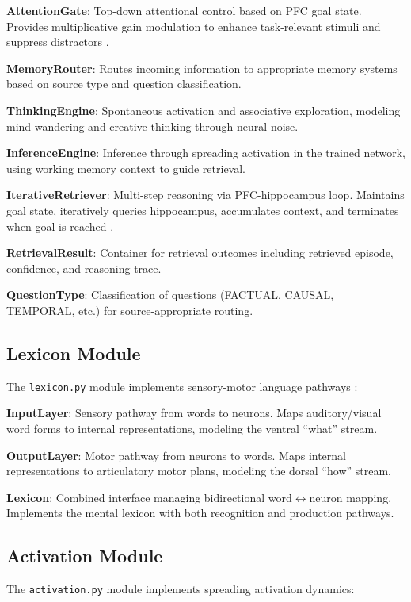 \documentclass[11pt]{article}
\begin{document}
\textbf{AttentionGate}: Top-down attentional control based on PFC goal state. Provides multiplicative gain modulation to enhance task-relevant stimuli and suppress distractors \citep{desimone1995neural}.

\textbf{MemoryRouter}: Routes incoming information to appropriate memory systems based on source type and question classification.

\textbf{ThinkingEngine}: Spontaneous activation and associative exploration, modeling mind-wandering and creative thinking through neural noise.

\textbf{InferenceEngine}: Inference through spreading activation in the trained network, using working memory context to guide retrieval.

\textbf{IterativeRetriever}: Multi-step reasoning via PFC-hippocampus loop. Maintains goal state, iteratively queries hippocampus, accumulates context, and terminates when goal is reached \citep{eichenbaum2017prefrontal}.

\textbf{RetrievalResult}: Container for retrieval outcomes including retrieved episode, confidence, and reasoning trace.

\textbf{QuestionType}: Classification of questions (FACTUAL, CAUSAL, TEMPORAL, etc.) for source-appropriate routing.

\subsection{Lexicon Module}

The \texttt{lexicon.py} module implements sensory-motor language pathways \citep{hickok2007cortical}:

\textbf{InputLayer}: Sensory pathway from words to neurons. Maps auditory/visual word forms to internal representations, modeling the ventral ``what'' stream.

\textbf{OutputLayer}: Motor pathway from neurons to words. Maps internal representations to articulatory motor plans, modeling the dorsal ``how'' stream.

\textbf{Lexicon}: Combined interface managing bidirectional word$\leftrightarrow$neuron mapping. Implements the mental lexicon with both recognition and production pathways.

\subsection{Activation Module}

The \texttt{activation.py} module implements spreading activation dynamics:
\end{document}
